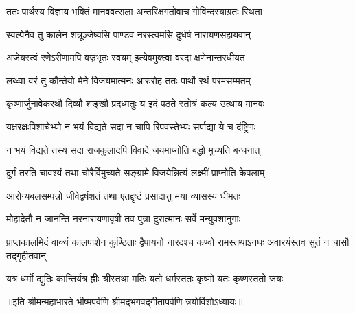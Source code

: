 
\twolineshloka
{ततः पार्थस्य विज्ञाय भक्तिं मानववत्सला}
{अन्तरिक्षगतोवाच गोविन्दस्याग्रतः स्थिता}


\twolineshloka
{स्वल्पेनैव तु कालेन शत्रूञ्जेष्यसि पाण्डव}
{नरस्त्वमसि दुर्धर्ष नारायणसहायवान्}

\twolineshloka
{अजेयस्त्वं रणेऽरीणामपि वज्रभृतः स्वयम्}
{इत्येवमुक्त्वा वरदा क्षणेनान्तरधीयत}

\twolineshloka
{लब्ध्वा वरं तु कौन्तेयो मेने विजयमात्मनः}
{आरुरोह ततः पार्थो रथं परमसम्मतम्}

\twolineshloka
{कृष्णार्जुनावेकरथौ दिव्यौ शङ्खौ प्रदध्मतुः}
{य इदं पठते स्तोत्रं कल्य उत्थाय मानवः}

\twolineshloka
{यक्षरक्षःपिशाचेभ्यो न भयं विद्यते सदा}
{न चापि रिपवस्तेभ्यः सर्पाद्या ये च दंष्ट्रिणः}

\twolineshloka
{न भयं विद्यते तस्य सदा राजकुलादपि}
{विवादे जयमाप्नोति बद्धो मुच्यति बन्धनात्}

\twolineshloka
{दुर्गं तरति चावश्यं तथा चोरैर्विमुच्यते}
{सङ्ग्रामे विजयेन्नित्यं लक्ष्मीं प्राप्नोति केवलाम्}

\twolineshloka
{आरोग्यबलसम्पन्नो जीवेद्वर्षशतं तथा}
{एतद्दृष्टं प्रसादात्तु मया व्यासस्य धीमतः}

\twolineshloka
{मोहादेतौ न जानन्ति नरनारायणावृषी}
{तव पुत्रा दुरात्मानः सर्वे मन्युवशानुगाः}


\threelineshloka
{प्राप्तकालमिदं वाक्यं कालपाशेन कुण्ठिताः}
{द्वैपायनो नारदश्च कण्वो रामस्तथाऽनघः}
{अवारयंस्तव सुतं न चासौ तद्गृहीतवान्}

\twolineshloka
{यत्र धर्मो द्युतिः कान्तिर्यत्र ह्रीः श्रीस्तथा मतिः}
{यतो धर्मस्ततः कृष्णो यतः कृष्णस्ततो जयः}

॥इति श्रीमन्महाभारते भीष्मपर्वणि श्रीमद्भगवद्गीतापर्वणि
त्रयोविंशोऽध्यायः॥
